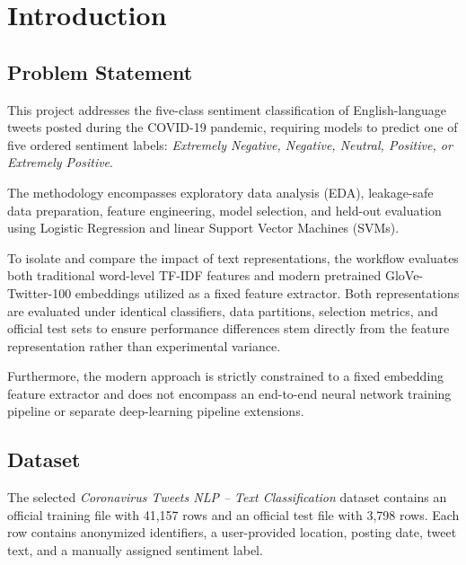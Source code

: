 \section{Introduction}

\subsection{Problem Statement}
This project addresses the five-class sentiment classification of English-language tweets 
posted during the COVID-19 pandemic, requiring models to predict one of five ordered sentiment 
labels: \textit{Extremely Negative, Negative, Neutral, Positive, or Extremely Positive}. 

The methodology encompasses exploratory data analysis (EDA), leakage-safe data preparation, 
feature engineering, model selection, and held-out evaluation using Logistic Regression and 
linear Support Vector Machines (SVMs). 

To isolate and compare the impact of text representations, the workflow evaluates both traditional 
word-level TF-IDF features and modern pretrained GloVe-Twitter-100 embeddings utilized as a fixed 
feature extractor. Both representations are evaluated under identical classifiers, data 
partitions, selection metrics, and official test sets to ensure performance differences stem 
directly from the feature representation rather than experimental variance. 

Furthermore, the modern approach is strictly constrained to a fixed embedding feature extractor 
and does not encompass an end-to-end neural network training pipeline or 
separate deep-learning pipeline extensions.

\subsection{Dataset}
The selected \textit{Coronavirus Tweets NLP -- Text Classification} dataset contains an 
official training file with 41,157 rows and an official test file with 3,798 rows. 
Each row contains anonymized identifiers, a user-provided location, posting date, tweet text, 
and a manually assigned sentiment label.

